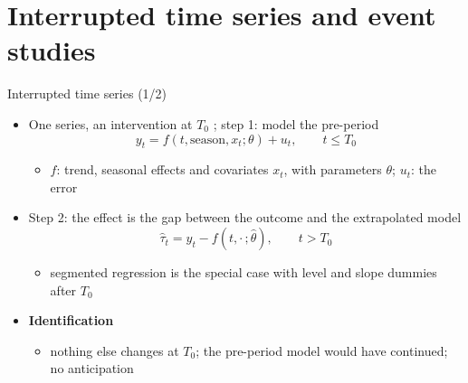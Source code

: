 \section{Interrupted time series and event studies}

\begin{frame}{Interrupted time series (1/2)}
\itemsize{\small}
\begin{itemize}
    \item One series, an intervention at $T_0$ ; step 1: model the pre-period \[ y_t = f(t, \text{season}, x_t; \theta) + u_t, \qquad t \le T_0 \]
    \begin{itemize}
        \item $f$: trend, seasonal effects and covariates $x_t$, with parameters $\theta$; $u_t$: the error
    \end{itemize}
    \item Step 2: the effect is the gap between the outcome and the extrapolated model \[ \hat\tau_t = y_t - f(t, \cdot\,; \hat\theta), \qquad t > T_0 \]
    \begin{itemize}
        \item segmented regression is the special case with level and slope dummies after $T_0$
    \end{itemize}
    \item \textbf{Identification}
    \begin{itemize}
        \item nothing else changes at $T_0$; the pre-period model would have continued; no anticipation
    \end{itemize}
\end{itemize}
\end{frame}

